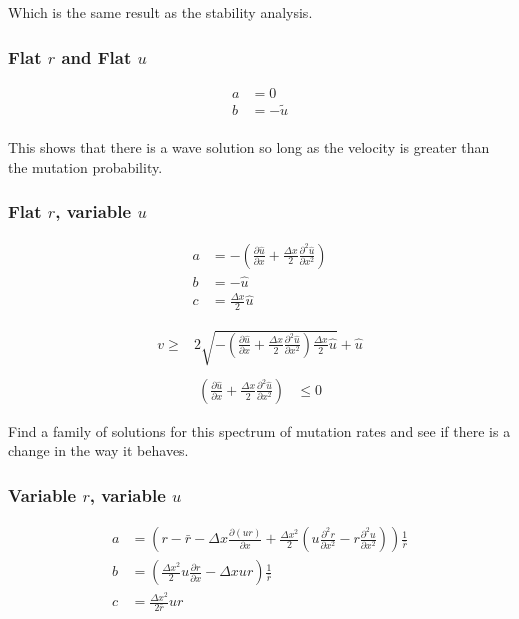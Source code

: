 \documentclass[a4paper]{article}
\begin{document}
Which is the same result as the stability analysis. 

\subsubsection*{Flat $r$ and Flat $u$}

\begin{align*}
a & = 0 \\
b & = - \tilde{u} \\
\end{align*}

This shows that there is a wave solution so long as the velocity is greater than the mutation probability. 

\subsubsection*{Flat $r$, variable $u$}

\begin{align*}
a & = - \left( \frac{\partial \hat{u}}{\partial x} + \frac{\Delta x}{2} \frac{\partial ^2 \hat{u}}{ \partial x ^2} \right) \\
b & = - \hat{u} \\
c & = \frac{\Delta x}{2} \hat{u}
\end{align*}

\begin{align*}
v \geq & 2 \sqrt{- \left( \frac{\partial \hat{u}}{\partial x} + \frac{\Delta x}{2} \frac{\partial ^2 \hat{u}}{ \partial x ^2} \right)\frac{\Delta x}{2} \hat{u} } + \hat{u} \\
\end{align*}
\begin{align*}
\left( \frac{\partial \hat{u}}{\partial x} + \frac{\Delta x}{2} \frac{\partial ^2 \hat{u}}{ \partial x ^2} \right) & \leq 0 
\end{align*}

Find a family of solutions for this spectrum of mutation rates and see if there is a change in the way it behaves. 

\subsubsection*{Variable $r$, variable $u$}

\begin{align*}
a & =\left( r-  \bar{r} - \Delta x \frac{\partial (ur)}{\partial x} + \frac{\Delta x ^2}{2} \left( u \frac{\partial ^2 r}{\partial x^2} - r \frac{\partial ^2 u}{\partial x^2} \right) \right) \frac{1}{\bar{r}} \\
b & = \left( \frac{\Delta x^2}{2} u \frac{\partial r}{\partial x} - \Delta x ur \right) \frac{1}{\bar{r}} \\
c & = \frac{\Delta x^2}{2 \bar{r}} ur
\end{align*}
\end{document}
